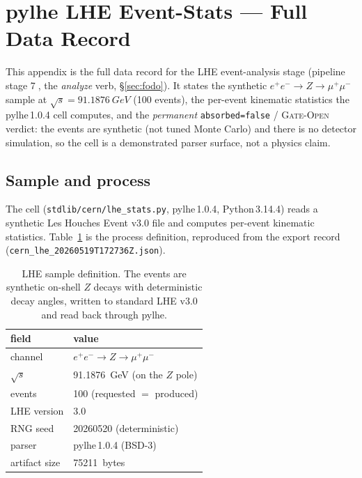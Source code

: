 \section{pylhe LHE Event-Stats --- Full Data Record}
\label{app:lhe}

This appendix is the full data record for the LHE event-analysis stage
(pipeline stage \textcircled{\scriptsize 7}, the \emph{analyze} verb,
\S\ref{sec:fodo}). It states the synthetic
$e^+e^-\!\to Z\!\to\mu^+\mu^-$ sample at $\sqrt{s}=\SI{91.1876}{GeV}$
(100 events), the per-event kinematic statistics the pylhe\,1.0.4 cell
computes, and the \emph{permanent} \texttt{absorbed=false} /
\textsc{Gate-Open} verdict: the events are synthetic (not tuned Monte
Carlo) and there is no detector simulation, so the cell is a
demonstrated parser surface, not a physics claim.

\subsection{Sample and process}
\label{app:lhe-sample}

The cell (\verb|stdlib/cern/lhe_stats.py|, pylhe\,1.0.4, Python\,3.14.4)
reads a synthetic Les Houches Event v3.0 file and computes per-event
kinematic statistics. Table~\ref{tab:app-lhe-proc} is the process
definition, reproduced from the export record
(\verb|cern_lhe_20260519T172736Z.json|).

\begin{table}[h]
\centering
\small
\begin{tabular}{@{}l l@{}}
\toprule
field & value \\
\midrule
channel              & $e^+e^-\to Z\to\mu^+\mu^-$ \\
$\sqrt{s}$           & \SI{91.1876}{GeV} (on the $Z$ pole) \\
events               & 100 (requested $=$ produced) \\
LHE version          & 3.0 \\
RNG seed             & 20260520 (deterministic) \\
parser               & pylhe\,1.0.4 (BSD-3) \\
artifact size        & \SI{75211}{bytes} \\
\bottomrule
\end{tabular}
\caption{LHE sample definition. The events are synthetic on-shell $Z$
decays with deterministic decay angles, written to standard LHE v3.0 and
read back through pylhe.}
\label{tab:app-lhe-proc}
\end{table}

